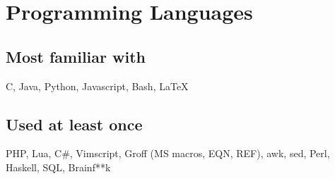 \documentclass[9pt]{extarticle}
\begin{document}
    \section{Programming Languages}
    \subsection{Most familiar with}
    C, Java, Python, Javascript, Bash, \LaTeX
    \subsection{Used at least once}
    PHP, Lua, C\#, Vimscript, Groff (MS macros, EQN, REF), awk, sed, Perl, Haskell, SQL, Brainf**k
\end{document}

